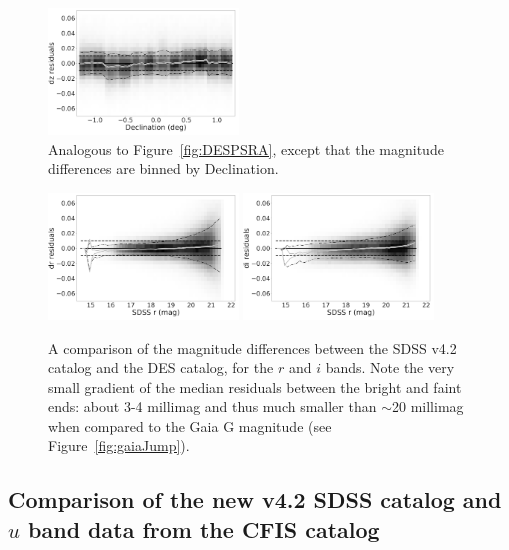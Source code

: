 \documentclass[fleqn,usenatbib]{mnras}
\begin{document}
\begin{figure}
    \centering\includegraphics[width=0.45\textwidth]{figures/colorResidPSDR2v42bright_dz_Dec_Hess_lr.png}
\caption{Analogous to Figure~\ref{fig:DESPSRA}, except that the magnitude differences
are binned by Declination.}
\label{fig:DESPSDec}
\end{figure}

\begin{figure}
    \centering\includegraphics[width=0.45\textwidth]{figures/colorResidDES42_dr_rmag_Hess_lr.png}
    \centering\includegraphics[width=0.45\textwidth]{figures/colorResidDES42_di_rmag_Hess_lr.png} 
\caption{A comparison of the magnitude differences between the SDSS v4.2 catalog
and the DES catalog, for the $r$ and $i$ bands. Note the very small gradient of the median
residuals between the bright and faint ends: about 3-4 millimag and thus much smaller
than $\sim$20 millimag when compared to the Gaia G magnitude (see Figure~\ref{fig:gaiaJump}).} 
\label{fig:drVSr}
\end{figure}



\subsection{Comparison of the new v4.2 SDSS catalog and $u$ band data from the CFIS catalog  \label{sec:CFIStest}} 
\end{document}
